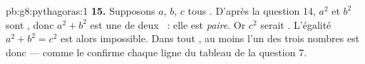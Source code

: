 \begin{solution}{pb:g8:pythagoras:1}
\textbf{15.} Supposons $a$, $b$, $c$ tous . D'après la
question 14, $a^2$ et $b^2$ sont , donc $a^2 + b^2$ est une
 de deux ~: elle est \emph{paire}. Or $c^2$
serait \emph{}. L'égalité $a^2 + b^2 = c^2$ est alors
impossible. Dans tout , au moins l'un des trois
nombres est donc  --- comme le confirme chaque ligne du tableau
de la question 7.
\end{solution}
